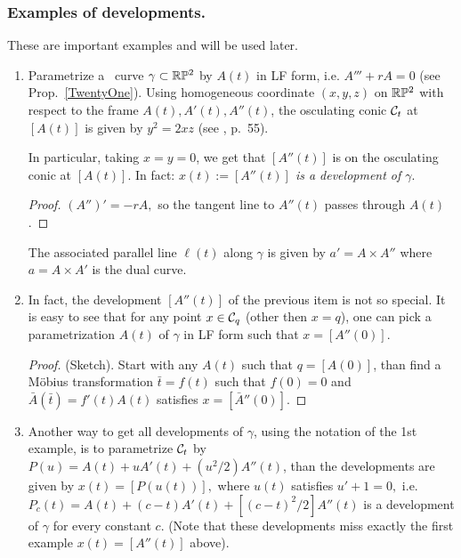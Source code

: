 \subsubsection{Examples of developments.} \label{examples}
 
These are important examples and will be used later.


\begin{enumerate}[leftmargin=18pt,label=(\arabic*)]\setlength\itemsep{5pt}
\item    Parametrize  a \lc\ curve $\gamma\subset\mathbb{R}\mathbb{P}^2$ by $A(t)$   in LF form, i.e. $A'''+rA=0$ (see Prop.~\ref{TwentyOne}). Using  homogeneous coordinate $(x,y,z)$ on $\mathbb{R}\mathbb{P}^2$  with respect to the frame $A(t),A'(t),A''(t)$, the osculating conic  $\mathcal{C}_t$ at  $[A(t)]$    is given by 
$y^2=2xz$  (see \cite{Cbook}, p.~55). 

In particular, taking  $x=y=0$, we get that  
$[A''(t)]$  is on the osculating conic at $[A(t)]$. In   fact:  {\em $ x(t):=[A''(t)]$
is  a  development of $\gamma$}. 

\begin{proof}  $(A'')' =-r A,$ so the tangent line to $A''(t)$ passes through $A(t)$. \end{proof}

The associated parallel line $\ell(t)$ along $\gamma$ is given by $a'=A\times A''$ where  $a=A\times A'$ is the dual curve. 


\item  In fact, the development $[A''(t)]$ of the previous item is not so special. It is easy to see that for any point $x\in\mathcal{C}_q$ (other then $x=q$), one can   pick a parametrization   $A(t)$ of $\gamma$ in LF form such that $x=[A''(0)]$. 

\begin{proof} (Sketch).  Start with any $A(t)$ such that $q=[A(0)]$, than find a M\"obius transformation $\bar t=f(t)$ such that $f(0)=0$ and  $\bar A(\bar t)=f'(t)A(t)$ satisfies $x=[\bar A''(0)].$\end{proof}

\item    Another way to get all  developments of $\gamma$, using the notation of the 1st example,  is to parametrize $\mathcal{C}_t$ by $P(u)=A(t)+uA'(t)+(u^2/2)A''(t)$, than the developments are given by $x(t)=[P(u(t))], $ where  $u(t)$ satisfies $u'+1=0,$ i.e. $P_c(t)=A(t)+(c-t)A'(t)+[(c-t)^2/2]A''(t) $ is a  development of $\gamma$ for every  constant $c$. (Note that these developments miss exactly the first example $x(t)=[A''(t)]$ above). 


\end{enumerate}
